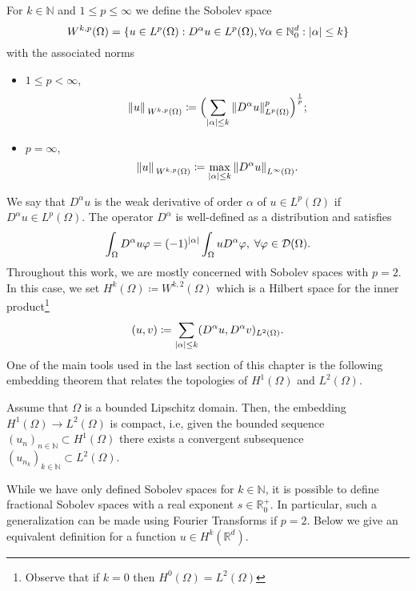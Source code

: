 \begin{definition}
    For \(k \in \mathbb{N}\) and \(1 \leq p \leq \infty\) we define the Sobolev space
    \[
    W^{k,p}(\Omega) = \{u \in L^p(\Omega): D^\alpha u \in L^p(\Omega), \forall \alpha \in \mathbb{N}_0^d: \abs{\alpha} \leq k\}
    \]
    with the associated norms
    \begin{itemize}
        \item \(1 \leq p < \infty\),
            \[
            \norm*{u}_{W^{k,p}(\Omega)} \coloneqq \Bigl(\sum_{\abs{\alpha} \leq k} \norm{D^\alpha u}_{L^p(\Omega)}^p\Bigr)^{\frac{1}{p}};
            \]
            \item \(p = \infty\),
            \[
            \norm*{u}_{W^{k,p}(\Omega)} \coloneqq \max_{\abs{\alpha} \leq k} \norm{D^\alpha u}_{L^\infty(\Omega)}.
            \]
    \end{itemize}

\end{definition}
We say that \(D^\alpha u\) is the weak derivative of order \(\alpha\) of \(u \in L^p(\Omega)\) if \(D^\alpha u \in L^p(\Omega)\). The operator \(D^\alpha\) is well-defined as a distribution and satisfies
\[
    \int_\Omega D^\alpha u \varphi = (-1)^\abs{\alpha} \int_\Omega u D^\alpha \varphi, \; \forall \varphi \in \mathcal{D}(\Omega).
\] 
Throughout this work, we are mostly concerned with Sobolev spaces with \(p=2\). In this case, we set \(H^k(\Omega) \coloneqq W^{k, 2}(\Omega)\) which is a Hilbert space for the inner product\footnote{Observe that if \(k=0\) then \(H^0(\Omega) = L^2(\Omega)\)}
\[
 (u, v) \coloneqq \sum_{\abs{\alpha} \leq k} (D^\alpha u, D^\alpha v)_{L^2(\Omega)}.
\]
One of the main tools used in the last section of this chapter is the following embedding theorem that relates the topologies of \(H^1(\Omega)\) and \(L^2(\Omega)\).
\begin{theorem}\label{rellich}
    Assume that \(\Omega\) is a bounded Lipschitz domain. Then, the embedding \(H^1(\Omega) \rightarrow L^2(\Omega)\) is compact, i.e, given the bounded sequence \((u_n)_{n \in \mathbb{N}} \subset H^1(\Omega)\) there exists a convergent subsequence \((u_{n_k})_{k \in \mathbb{N}} \subset L^2(\Omega)\).
\end{theorem}
While we have only defined Sobolev spaces for \(k \in \mathbb{N}\), it is possible to define fractional Sobolev spaces with a real exponent \(s \in \mathbb{R}_0^+\). In particular, such a generalization can be made using Fourier Transforms if \(p=2\). Below we give an equivalent definition for a function \(u \in H^k(\mathbb{R}^d)\).
